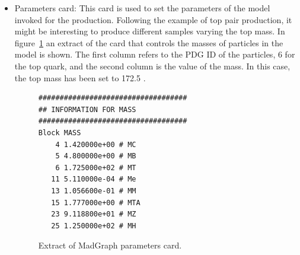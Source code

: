 \begin{itemize}
  \item Parameters card: This card is used to set the parameters of the model invoked for the production. Following the example of top pair production, it might be interesting to produce different samples varying the top mass. In figure~\ref{fig:ParamCard} an extract of the card that controls the masses of particles in the model is shown. The first column refers to the PDG ID of the particles, 6 for the top quark, and the second column is the value of the mass. In this case, the top mass has been set to 172.5 \GeVcc.
    \begin{figure}[!Hhtbp]
      \begin{center}
        \begin{minipage}[c]{0.45\textwidth}
\begin{verbatim}
###################################
## INFORMATION FOR MASS
###################################
Block MASS 
    4 1.420000e+00 # MC 
    5 4.800000e+00 # MB 
    6 1.725000e+02 # MT 
   11 5.110000e-04 # Me 
   13 1.056600e-01 # MM 
   15 1.777000e+00 # MTA 
   23 9.118800e+01 # MZ 
   25 1.250000e+02 # MH 
\end{verbatim}
        \end{minipage}
          \caption{Extract of MadGraph parameters card.}
          \label{fig:ParamCard}
      \end{center}
    \end{figure}


\end{itemize}
